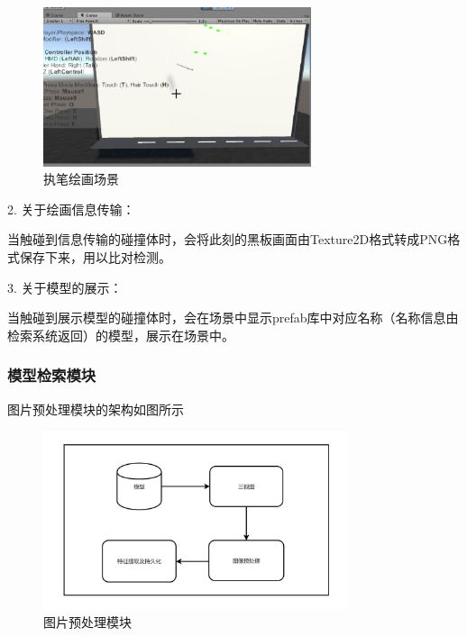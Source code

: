 \documentclass{article}
\begin{document}
\begin{enumerate}
    \begin{figure}[htb]
    \centering
    \includegraphics[width=0.7\textwidth]{images/draw.jpg}
    \caption{执笔绘画场景}\label{fig:digit}
    \end{figure} 
    
     
    2.  关于绘画信息传输：
    
    \qquad 当触碰到信息传输的碰撞体时，会将此刻的黑板画面由Texture2D格式转成PNG格式保存下来，用以比对检测。
    
    
    3.  关于模型的展示：
    
    \qquad 当触碰到展示模型的碰撞体时，会在场景中显示prefab库中对应名称（名称信息由检索系统返回）的模型，展示在场景中。
    
\end{enumerate}
 
\clearpage

\subsubsection{模型检索模块}

图片预处理模块的架构如图所示

\begin{figure}[htb]
\centering
\includegraphics[width=0.8\textwidth]{images/pre-process.png}
\caption{图片预处理模块}\label{fig:digit}
\end{figure} 
\end{document}
